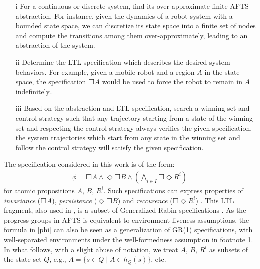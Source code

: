 \begin{itemize}
	\item[i] For a continuous or discrete system, find its over-approximate {\color{purple} finite} AFTS abstraction. For instance, given the dynamics of a robot system with {\color{purple} a bounded} state space, we can discretize its state space into {\color{purple} a finite set of nodes} and compute the transitions among them over-approximately,  {\color{purple} leading to an abstraction of the system}.
	\item[ii] Determine the LTL specification which describes the desired system behaviors. For example, given a mobile robot and a region $ A $ in the state space, the specification $ \Square A $ {\color{purple} would be used to force the robot to remain in $A$ indefinitely.}. 
	\item[iii] Based on the abstraction and LTL specification, search {\color{purple} a} winning set and control strategy such that {\color{purple} any trajectory starting from a state of the winning set and respecting the control strategy always verifies the given specification.} the system trajectories which start from any state in the winning set and follow the control strategy will satisfy the given specification.
\end{itemize}
\fi


The specification considered in this work is of the form:
\begin{align}
\phi = \Square A \wedge \Diamond \Square B \wedge \left( \bigwedge_{i\in I} \Square \Diamond R^i\right)\label{phi}
\end{align}
for atomic propositions $A$, $B$, $R^i$. Such specifications can express properties of \emph{invariance} ($\Square A$), \emph{persistence} ($\Diamond \Square B$) and \emph{reccurence}
{\color{purple} ($\Square \Diamond R^i$)}
. This LTL fragment, also used in \cite{wolff2013efficient,Nilsson2017}, is a subset of Generalized Rabin specifications \cite{ehlers2017supervisory}. As the progress groups in AFTS is equivalent to environment liveness assumptions, the formula in \eqref{phi} can also be seen as a generalization of GR(1) specifications, with well-separated environments \cite{klein2010revisiting, maoz2016well,schmuckrelation} under the well-formedness assumption in footnote 1. In what follows, with a slight abuse of notation, we treat $A$, $B$, $R^i$ as subsets of the state set $Q$, e.g., $A = \{ s\in Q \mid A\in h_Q(s)\}$, etc.

